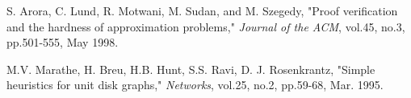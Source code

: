\documentclass[12pt,journal,onecolumn,draftcls]{IEEEtran}
\begin{document}
\begin{thebibliography}{11}
S. Arora, C. Lund, R. Motwani, M. Sudan, and M. Szegedy, "Proof verification and the hardness of approximation problems," \textit{Journal of the ACM}, vol.45, no.3, pp.501-555, May 1998.

M.V. Marathe, H. Breu, H.B. Hunt, S.S. Ravi, D. J. Rosenkrantz, "Simple heuristics for unit disk graphs," \textit{Networks}, vol.25, no.2, pp.59-68, Mar. 1995.

\end{thebibliography}


\end{document}

